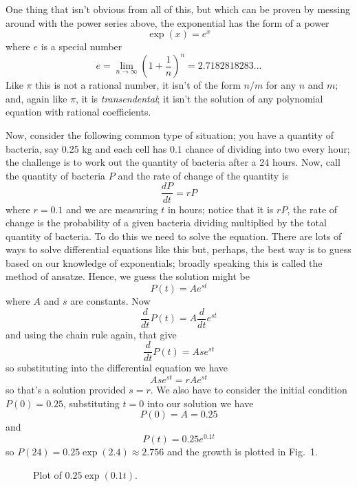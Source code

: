 \documentclass[12pt]{article}
\begin{document}
One thing that isn't obvious from all of this, but which can be proven by messing around with the power series above, the exponential has the form of a power
\begin{equation}
\exp(x)=e^{x}
\end{equation}
where $e$ is a special number
\begin{equation}
e=\lim_{n\rightarrow \infty}\left(1+\frac{1}{n}\right)^n= 2.7182818283\ldots
\end{equation}
Like $\pi$ this is not a rational number, it isn't of the form $n/m$
for any $n$ and $m$; and, again like $\pi$, it is
\textsl{transendental}; it isn't the solution of any polynomial
equation with rational coefficients.

Now, consider the following common type of situation; you have a
quantity of bacteria, say 0.25 kg and each cell has $0.1$ chance of
dividing into two every hour; the challenge is to work out the
quantity of bacteria after a 24 hours. Now, call the quantity of
bacteria $P$ and the rate of change of the quantity is
\begin{equation}
\frac{dP}{dt}=rP
\end{equation}
where $r=0.1$ and we are measuring $t$ in hours; notice that it is
$rP$, the rate of change is the probability of a given bacteria
dividing multiplied by the total quantity of bacteria. To do this we
need to solve the equation. There are lots of ways to solve
differential equations like this but, perhaps, the best way is to
guess based on our knowledge of exponentials; broadly speaking this is
called the method of ansatze. Hence, we guess the solution might be
\begin{equation}
P(t)=Ae^{st}
\end{equation}
where $A$ and $s$ are constants. Now
\begin{equation}
\frac{d}{dt}P(t)=A\frac{d}{dt}e^{st}
\end{equation}
and using the chain rule again, that give 
\begin{equation}
\frac{d}{dt}P(t)=Ase^{st}
\end{equation}
so substituting into the differential equation we have
\begin{equation}
Ase^{st}=rAe^{st}
\end{equation}
so that's a solution provided $s=r$. We also have to consider the initial condition $P(0)=0.25$, substituting $t=0$ into our solution we have
\begin{equation}
P(0)=A=0.25
\end{equation}
and
\begin{equation}
P(t)=0.25e^{0.1t}
\end{equation}
so $P(24)=0.25\exp(2.4)\approx 2.756$ and the growth is plotted in Fig.~1.
\begin{figure}
\begin{center}

\end{center}
\caption{Plot of $0.25\exp(0.1t)$.}
\end{figure}
\end{document}
